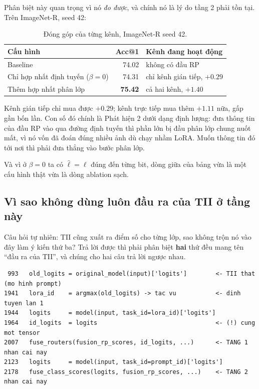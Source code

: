 \documentclass[11pt,a4paper]{article}
\begin{document}
Phân biệt này quan trọng vì nó \emph{đo được}, và chính nó là lý do tầng 2 phải
tồn tại. Trên ImageNet-R, seed 42:

\begin{table}[htbp]
\centering
\caption{Đóng góp của từng kênh, ImageNet-R seed 42.}
\label{tab:dong-gop-kenh}
\begin{tabular}{@{}lrl@{}}
\toprule
Cấu hình & Acc@1 & Kênh đang hoạt động \\
\midrule
Baseline & 74.02 & không có đầu RP \\
Chỉ hợp nhất định tuyến ($\beta = 0$) & 74.31 & chỉ kênh gián tiếp, $+0.29$ \\
Thêm hợp nhất phân lớp & \textbf{75.42} & cả hai kênh, $+1.40$ \\
\bottomrule
\end{tabular}
\end{table}

Kênh gián tiếp chỉ mua được $+0.29$; kênh trực tiếp mua thêm $+1.11$ nữa, gấp gần
bốn lần. Con số đó chính là Phát hiện 2 dưới dạng định lượng: đưa thông tin của
đầu RP vào qua đường định tuyến thì phần lớn bị đầu phân lớp chung nuốt mất, vì
nó vốn đã đoán đúng nhiều ảnh dù chạy nhầm LoRA. Muốn thông tin đó tới nơi thì
phải đưa thẳng vào bước phân lớp.

Và vì ở $\beta = 0$ ta có $\hat{\ell} = \ell$ đúng đến từng bit, dòng giữa của
bảng vừa là một cấu hình thật vừa là dòng ablation sạch.

\subsection{Vì sao không dùng luôn đầu ra của TII ở tầng này}
\label{sec:tii-tang2}

Câu hỏi tự nhiên: TII cũng xuất ra điểm số cho từng lớp, sao không trộn nó vào
đây làm ý kiến thứ ba? Trả lời được thì phải phân biệt \textbf{hai} thứ đều mang
tên ``đầu ra của TII'', và chúng cho hai câu trả lời ngược nhau.

\begin{footnotesize}
\begin{verbatim}
 993   old_logits = original_model(input)['logits']        <- TII that (mo hinh prompt)
1941   lora_id    = argmax(old_logits) -> tac vu           <- dinh tuyen lan 1
1944   logits     = model(input, task_id=lora_id)['logits']
1964   id_logits  = logits                                 <- (!) cung mot tensor
2007   fuse_routers(fusion_rp_scores, id_logits, ...)      <- TANG 1 nhan cai nay
2123   logits     = model(input, task_id=prompt_id)['logits']
2178   fuse_class_scores(logits, fusion_rp_scores, ...)    <- TANG 2 nhan cai nay
\end{verbatim}
\end{footnotesize}
\end{document}
